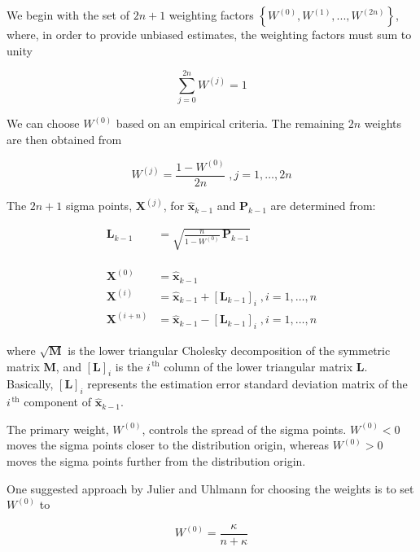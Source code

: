 We begin with the set of $2n + 1$ weighting factors $\left\{ W^{(0)}, W^{(1)}, ..., W^{(2n)} \right\}$,
where, in order to provide unbiased estimates, the weighting factors must sum to unity

\begin{equation*}
    \sum_{j=0}^{2n} W^{(j)} = 1
\end{equation*}

We can choose $W^{(0)}$ based on an empirical criteria. The remaining $2n$ weights are
then obtained from

\begin{equation*}
    W^{(j)} = \frac{1 - W^{(0)}}{2 n} \; , j=1,\dots,2n
\end{equation*}

The $2n + 1$ sigma points, $\mathbf{X}^{(j)}$, for $\hat{\mathbf{x}}_{k-1}$ and $\mathbf{P}_{k-1}$
are determined from:

\begin{equation*}
    \begin{aligned}
        \mathbf{L}_{k-1} &= \sqrt{ \frac{n}{1 - W^{(0)}} \, \mathbf{P}_{k-1} } \\
        \phantom{X} \\
        \mathbf{X}^{(0)} &= \hat{\mathbf{x}}_{k-1} \\
        \mathbf{X}^{(i)} &= \hat{\mathbf{x}}_{k-1} + \left[ \mathbf{L}_{k-1} \right]_i \; , i=1,\dots,n \\
        \mathbf{X}^{(i+n)} &= \hat{\mathbf{x}}_{k-1} - \left[ \mathbf{L}_{k-1} \right]_i \; , i=1,\dots,n
    \end{aligned}
\end{equation*}

where $\sqrt{\mathbf{M}}$ is the lower triangular Cholesky decomposition of the symmetric
matrix $\mathbf{M}$, and $\left[ \mathbf{L} \right]_i$ is the $i^{\, \text{th}}$ column
of the lower triangular matrix $\mathbf{L}$. Basically, $\left[ \mathbf{L} \right]_i$
represents the estimation error standard deviation matrix of the $i^{\, \text{th}}$
component of $\hat{\mathbf{x}}_{k-1}$.

The primary weight, $W^{(0)}$, controls the spread of the sigma points. $W^{(0)} < 0$ moves
the sigma points closer to the distribution origin, whereas $W^{(0)} > 0$ moves the sigma
points further from the distribution origin.

One suggested approach by Julier and Uhlmann \cite{julieruhlmann1997} for choosing the
weights is to set $W^{(0)}$ to

\begin{equation*}
    W^{(0)} = \frac{\kappa}{n + \kappa}
\end{equation*}

